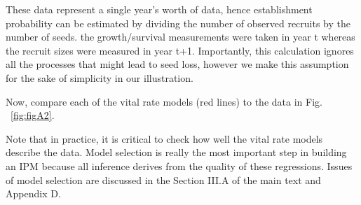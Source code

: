 \documentclass[11pt]{article}
\begin{document}
These data represent a single year's worth of data, hence establishment probability can be estimated by dividing the number of observed recruits by the number of seeds. the growth/survival measurements were taken in year t whereas the recruit sizes were measured in year t+1. Importantly, this calculation ignores all the processes that might lead to seed loss, however we make this assumption for the sake of simplicity in our illustration.
\begin{Schunk}
\end{Schunk}

Now, compare each of the vital rate models (red lines) to the data in Fig. ~\ref{fig:figA2}.

Note that in practice, it is critical to check how well the vital rate models describe the data. Model selection is really the most important step in building an IPM because all inference derives from the quality of these regressions. Issues of model selection are discussed in the Section III.A of the main text and Appendix D. 
\end{document}
